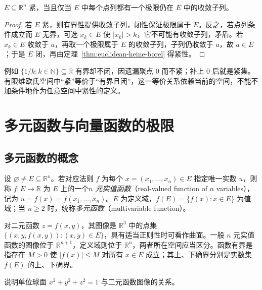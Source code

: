 \begin{corollary}[紧性的点列刻画]
\label{cor:euclidean-sequential-compactness}
$E\subseteq\mathbb R^n$ 紧，当且仅当 $E$ 中每个点列都有一个极限仍在 $E$ 中的收敛子列。
\end{corollary}

\begin{proof}
若 $E$ 紧，则有界性提供收敛子列，闭性保证极限属于 $E$。反之，若点列条件成立而 $E$ 无界，可选 $x_k\in E$ 使 $|x_k|>k$，它不可能有收敛子列，矛盾。若 $x_k\in E$ 收敛于 $a$，再取一个极限属于 $E$ 的收敛子列，子列仍收敛于 $a$，故 $a\in E$；于是 $E$ 闭，再由定理~\ref{thm:euclidean-heine-borel} 得紧性。
\end{proof}

例如 $\{1/k:k\in\mathbb N\}\subseteq\mathbb R$ 有界却不闭，因遗漏聚点 $0$ 而不紧；补上 $0$ 后就是紧集。有限维欧氏空间中“紧”等价于“有界且闭”，这一等价关系依赖当前的空间，不能不加条件地作为任意空间中紧性的定义。

\section{多元函数与向量函数的极限}
\label{sec:limits-of-multivariable-and-vector-functions}

\subsection{多元函数的概念}
\label{subsec:concept-of-multivariable-functions}

\begin{definition}
\label{def:multivariable-real-valued-function}
设 $\varnothing\neq E\subseteq\mathbb R^n$。若对应法则 $f$ 为每个 $x=(x_1,\ldots,x_n)\in E$ 指定唯一实数 $u$，则称 $f:E\to\mathbb R$ 为 $E$ 上的一个\emph{$n$ 元实值函数}（real-valued function of $n$ variables），记为 $u=f(x)=f(x_1,\ldots,x_n)$。$E$ 为定义域，$f(E)=\{f(x):x\in E\}$ 为值域；当 $n\geq2$ 时，统称\emph{多元函数}（multivariable function）。
\end{definition}

对二元函数 $z=f(x,y)$，其图像是 $\mathbb R^3$ 中的点集 $\{(x,y,f(x,y)):(x,y)\in E\}$，具有适当正则性时可看作曲面。一般 $n$ 元实值函数的图像位于 $\mathbb R^{n+1}$，定义域则位于 $\mathbb R^n$，两者所在空间应当区分。函数有界是指存在 $M>0$ 使 $|f(x)|\leq M$ 对所有 $x\in E$ 成立；其上、下确界分别是实数集 $f(E)$ 的上、下确界。

\begin{example}
\label{ex:sphere-two-hemisphere-graphs}
说明单位球面 $x^2+y^2+z^2=1$ 与二元函数图像的关系。
\end{example}


